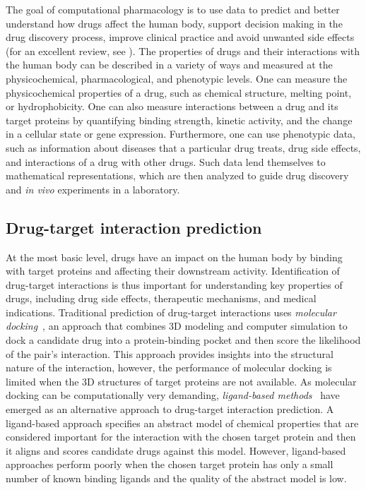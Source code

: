 \documentclass[5p]{elsarticle}
\newcommand{\rev}[1]{{\color{black}#1}}
\begin{document}
The goal of computational pharmacology is to use data to predict and better understand how drugs affect the human body, support decision making in the drug discovery process, improve clinical practice and avoid unwanted side effects (for an excellent review, see \cite{Li2015,Hodos2016}).
%
The properties of drugs and their interactions with the human body can be described in a variety of ways and measured at the physicochemical, pharmacological, and phenotypic levels.
One can measure the physicochemical properties of a drug, such as chemical structure, melting point, or hydrophobicity.
One can also measure interactions between a drug and its \rev{target proteins} by quantifying binding strength, kinetic activity, and the change in a cellular state or gene expression.
Furthermore, one can use phenotypic data, such as information about diseases that a particular drug treats, drug side effects, and interactions of a drug with other drugs.
Such data lend themselves to mathematical representations, which are then analyzed to guide drug discovery and {\em in vivo} experiments in a laboratory.

\subsection{Drug-target interaction prediction}\label{sec:drug-target-interaction-prediction}

At the most basic level, drugs have an impact on the human body by binding with \rev{target proteins} and affecting their downstream activity.
Identification of drug-target interactions is thus important for understanding key properties of drugs, including drug side effects, therapeutic mechanisms, and medical indications.
Traditional prediction of drug-target interactions uses {\em molecular docking}~\cite{Donald2011algorithms}, an approach that combines 3D modeling and computer simulation to dock a candidate drug into a protein-binding pocket and then score the likelihood of the pair's interaction.
This approach provides insights into the structural nature of the interaction, however, the performance of molecular docking is limited when the 3D structures of target proteins are not available.
As molecular docking can be computationally very demanding, {\em ligand-based methods}~\cite{Keiser2007relating} have emerged as an alternative approach to drug-target interaction prediction.
A ligand-based approach specifies an abstract model of chemical properties that are considered important for the interaction with the chosen target protein and then it aligns and scores candidate drugs against this model.
However, ligand-based approaches perform poorly when the chosen target protein has only a small number of known binding ligands and the quality of the abstract model is low.
\end{document}
